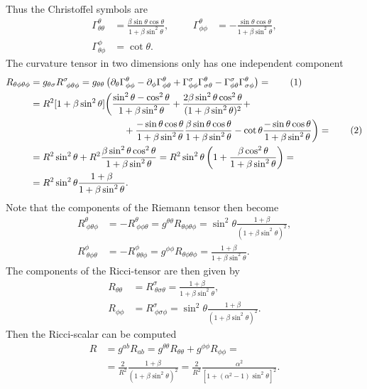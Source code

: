 \documentclass[english, parskip=full]{scrartcl}
\newcommand\numberthis{\addtocounter{equation}{1}\tag{\theequation}}
\newcommand{\kla}{}
\newcommand{\klam}{}
\begin{document}
Thus the Christoffel symbols are
\begin{align}
\Gamma^\theta_{\theta\theta} &= \frac{\beta \sin\theta\cos\theta}{1 + \beta \sin^2\theta}, &&& \Gamma^\theta_{\phi\phi} &= -\frac{\sin\theta \cos\theta}{1 + \beta \sin^2\theta},\\
\Gamma^\phi_{\theta\phi} &= \cot\theta.
\end{align}
The curvature tensor in two dimensions only has one independent component
\begin{align*}
R_{\theta\phi\theta\phi} &= g_{\theta \sigma} R^\sigma_{\ \phi\theta \phi} = g_{\theta\theta} \kla\left( \partial_\theta \Gamma^\theta_{\phi\phi} - \partial_\phi \Gamma^\theta_{\phi\theta} + \Gamma^\sigma_{\phi\phi} \Gamma^\theta_{\sigma\theta} - \Gamma^\sigma_{\phi\theta} \Gamma^\theta_{\sigma\phi} \right) = \numberthis \\
&= R^2 [1 + \beta\sin^2\theta] \kla\bigg( \frac{\sin^2\theta - \cos^2\theta}{1 + \beta\sin^2\theta} + \frac{2\beta\sin^2\theta\cos^2\theta }{(1 + \beta\sin^2\theta)^2} + \\
&\hspace{3.5cm} + \frac{-\sin\theta\cos\theta}{ 1 + \beta\sin^2\theta } \frac{\beta\sin\theta\cos\theta }{1 + \beta\sin^2\theta} - \cot\theta \frac{-\sin\theta\cos\theta }{1 + \beta\sin^2\theta} \bigg) = \numberthis \\ 
&= R^2\sin^2\theta + R^2\frac{\beta \sin^2\theta\cos^2\theta }{1 + \beta\sin^2\theta} = R^2\sin^2\theta \kla\left( 1 + \frac{\beta\cos^2\theta}{1 + \beta\sin^2\theta} \right) = \\
&= R^2\sin^2\theta \frac{1 + \beta}{1 + \beta\sin^2\theta}.
\end{align*}
Note that the components of the Riemann tensor then become
\begin{align}
R^\theta_{\ \phi\theta\phi} &= -R^\theta_{\ \phi\phi\theta} = g^{\theta\theta} R_{\theta\phi \theta\phi} = \sin^2\theta \frac{1 + \beta}{(1 + \beta\sin^2\theta)^2},\\
R^\phi_{\ \theta\phi\theta} &= -R^\phi_{\ \theta\theta\phi} = g^{\phi\phi} R_{\theta\phi\theta\phi} = \frac{1 + \beta}{1 + \beta\sin^2\theta}.
\end{align}
The components of the Ricci-tensor are then given by
\begin{align}
R_{\theta\theta} &= R^\sigma_{\ \theta\sigma\theta} = \frac{1 + \beta}{1 + \beta\sin^2\theta},\\
R_{\phi\phi} &= R^\sigma_{\ \phi\sigma\phi} = \sin^2\theta \frac{1 + \beta}{(1 + \beta\sin^2\theta)^2}.
\end{align}
Then the Ricci-scalar can be computed
\begin{align}
R &= g^{ab}R_{ab} = g^{\theta\theta} R_{\theta\theta} + g^{\phi\phi} R_{\phi\phi} = \\
&=  \frac{2}{R^2}\frac{1 + \beta}{(1 + \beta\sin^2\theta)^2} = \frac{2}{R^2} \frac{\alpha^2}{\klam\left[ 1 + (\alpha^2 - 1)\sin^2\theta \right]^2}.
\end{align}
\end{document}

